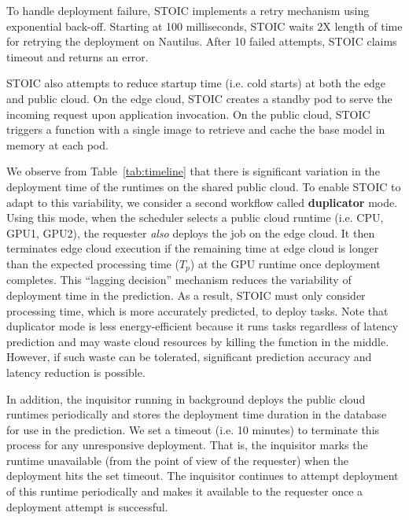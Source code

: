 To handle deployment failure, STOIC implements a retry mechanism using exponential back-off. Starting at 100 milliseconds, STOIC waits 2X length of time for retrying the deployment on Nautilus. After 10 failed attempts, STOIC claims timeout and returns an error.

STOIC also attempts to reduce startup time (i.e. cold starts) at both the edge and public cloud. On the edge cloud, STOIC creates a standby pod to serve the incoming request upon application invocation. On the public cloud, STOIC triggers a function with a single image to retrieve and cache the base model in memory at each pod.
 

We observe from Table~\ref{tab:timeline} that there is significant variation in the deployment time of the runtimes on the shared public cloud. To enable STOIC to adapt to this variability, we consider a second workflow called \textbf{duplicator} mode. Using this mode, when the scheduler selects a public cloud runtime (i.e. CPU, GPU1, GPU2), the requester \textit{also} deploys the job on the edge cloud. It then terminates edge cloud execution if the remaining time at edge cloud is longer than the expected processing time ($T_p$) at the GPU runtime once deployment completes. This ``lagging decision'' mechanism reduces the variability of deployment time in the prediction. As a result, STOIC must only consider processing time, which is more accurately predicted, to deploy tasks. Note that duplicator mode is less energy-efficient because it runs tasks regardless of latency prediction and may waste cloud resources by killing the function in the middle. However, if such waste can be tolerated, significant prediction accuracy and latency reduction is possible.

In addition, the inquisitor running in background deploys the public cloud runtimes periodically and stores the deployment time duration in the database for use in the prediction. We set a timeout (i.e. 10 minutes) to terminate this process for any unresponsive deployment. That is, the inquisitor marks the runtime unavailable (from the point of view of the requester) when the deployment hits the set timeout. The inquisitor continues to attempt deployment of this runtime periodically and makes it available to the requester once a deployment attempt is successful.

